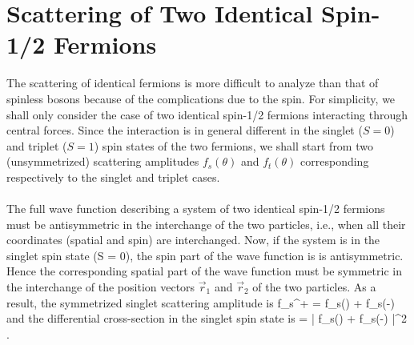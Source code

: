 \section{Scattering of Two Identical Spin-1/2 Fermions}
The scattering of identical fermions is more difficult to analyze than that of spinless 
bosons because of the complications due to the spin. For simplicity, we shall only 
consider the case of two identical spin-1/2 fermions interacting through central forces. 
Since the interaction is in general different in the singlet ($S=0$) and triplet ($S=1$) 
spin states of the two fermions, we shall start from two (unsymmetrized) scattering 
amplitudes $f_s(\theta)$ and $f_t(\theta)$ corresponding respectively to the singlet and triplet cases. 

\paragraph{}
The full wave function describing a system of two identical spin-1/2 fermions 
must be antisymmetric in the interchange of the two particles, i.e., when all their 
coordinates (spatial and spin) are interchanged. Now, if the system is in the singlet 
spin state (S = 0), the spin part of the wave function is is 
antisymmetric. Hence the corresponding spatial part of the wave function must be 
symmetric in the interchange of the position vectors $\vec{r}_1$ and $\vec{r}_2$ of the two particles. 
As a result, the symmetrized singlet scattering amplitude is 
\be
f_{s^+} = f_s(\theta) + f_s(\pi-\theta)
\ee
and the differential cross-section in the singlet spin state is
\be
{} = \left | f_s(\theta) + f_s(\pi-\theta) \right|^2\, .
\ee

